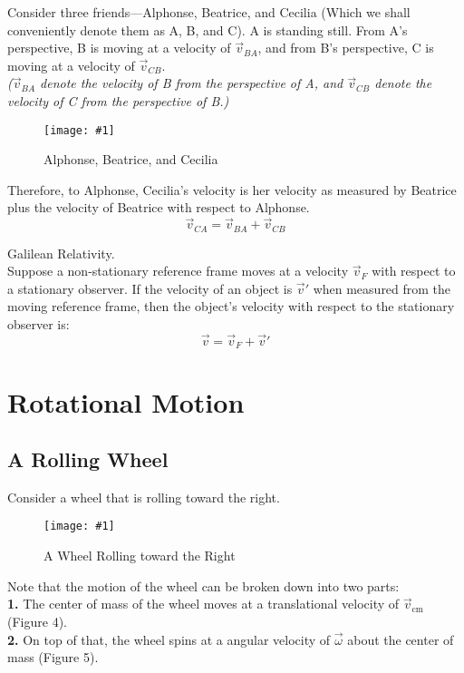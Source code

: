 \documentclass[11pt]{article}
\newcommand{\fig}[4]{
    \begin{figure}[H]
        \centering
        \texttt{[image: \#1]}
        \caption{#2}
        \label{exp4fit}
    \end{figure}
}
\theoremstyle{gangnamstyle}{\newtheorem{definition}{Definition}[]}
\theoremstyle{gangnamstyle}{\newtheorem{example}{Example}[]}
\theoremstyle{gangnamstyle}{\newtheorem{problem}{Problem}[]}
\theoremstyle{gangnamstyle}{\newtheorem{warning}{Warning}[]}
\begin{document}
Consider three friends---Alphonse, Beatrice, and Cecilia (Which we shall conveniently denote them as A, B, and C). A is standing still. From A's perspective, B is moving at a velocity of $\Vec{v}_{BA}$, and from B's perspective, C is moving at a velocity of $\Vec{v}_{CB}$. \\
\textit{($\Vec{v}_{BA}$ denote the velocity of B from the perspective of A, and $\Vec{v}_{CB}$ denote the velocity of C from the perspective of B.)}

\fig{figs/n8/rel.jpeg}{Alphonse, Beatrice, and Cecilia}{0.125}{0}

Therefore, to Alphonse, Cecilia's velocity is her velocity as measured by Beatrice plus the velocity of Beatrice with respect to Alphonse. 
\[ \Vec{v}_{CA} = \Vec{v}_{BA} + \Vec{v}_{CB} \]

\begin{definition}
Galilean Relativity. \\
Suppose a non-stationary reference frame moves at a velocity $\Vec{v}_F$ with respect to a stationary observer. If the velocity of an object is $\Vec{v}'$ when measured from the moving reference frame, then the object's velocity with respect to the stationary observer is: 
\begin{equation}
\Vec{v} = \Vec{v}_F + \Vec{v}'
\end{equation}
\end{definition}

\pagebreak

\section{Rotational Motion}

\subsection{A Rolling Wheel}

Consider a wheel that is rolling toward the right. 

\fig{figs/n8/wheel.png}{A Wheel Rolling toward the Right}{0.45}{0}

Note that the motion of the wheel can be broken down into two parts: \\
\textbf{1.} The center of mass of the wheel moves at a translational velocity of $\Vec{v}_{\text{cm}}$ (Figure 4). \\
\textbf{2.} On top of that, the wheel spins at a angular velocity of $\Vec{\omega}$ about the center of mass (Figure 5). 
\end{document}
